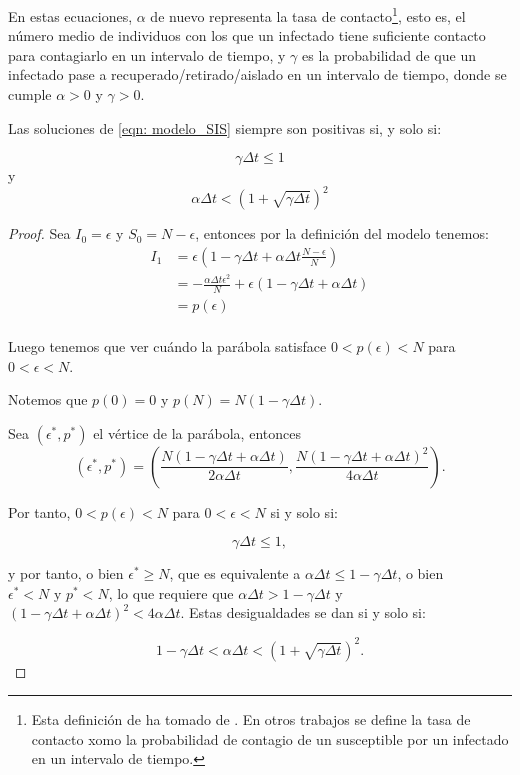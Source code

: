 En estas ecuaciones, $\alpha$ de nuevo representa la tasa de contacto\footnote{Esta definición de ha tomado de \cite{allenDiscretetimeSISIR1994}. En otros trabajos se define la tasa de contacto xomo la probabilidad de contagio de un susceptible por un infectado en un intervalo de tiempo.}, esto es, el número medio de individuos con los que un infectado tiene suficiente contacto para contagiarlo en un intervalo de tiempo, y $\gamma$ es la probabilidad de que un infectado pase a recuperado/retirado/aislado en un intervalo de tiempo, donde se cumple $\alpha >0$ y $\gamma >0$.

\begin{proposition}
Las soluciones de \eqref{eqn: modelo_SIS} siempre son positivas si, y solo si:

$$\gamma \Delta t \leq 1 $$ y $$\alpha\Delta t< \left( 1+\sqrt{\gamma \Delta t} \right)^2$$

\end{proposition}
\begin{proof}
Sea $I_0=\epsilon$ y $S_0=N-\epsilon$, entonces por la definición del modelo tenemos:
\begin{equation}
\begin{aligned}
I_1 & =\epsilon\left(1-\gamma\Delta t+\alpha\Delta t\frac{N-\epsilon}{N}\right) \\
& = -\frac{\alpha\Delta t \epsilon^2}{N} + \epsilon(1-\gamma\Delta t+\alpha\Delta t ) \\
& = p(\epsilon) \\
\end{aligned}
\end{equation}

Luego tenemos que ver cuándo la parábola satisface $0<p(\epsilon)<N$ para $0<\epsilon<N$.

Notemos que $p(0)=0$ y $p(N)=N(1-\gamma\Delta t).$

Sea $(\epsilon^*, p^*)$ el vértice de la parábola, entonces 
$$(\epsilon^*, p^*) = \left(\frac{N(1-\gamma\Delta t+\alpha\Delta t)}{2\alpha\Delta t}, \frac{N(1-\gamma\Delta t+\alpha\Delta t)^2}{4\alpha\Delta t}\right).$$

Por tanto, $0<p(\epsilon )<N$ para $0<\epsilon <N$ si y solo si:

$$\gamma\Delta t \leq 1,$$

y por tanto, o bien $\epsilon^* \geq N$, que es equivalente a $\alpha\Delta t \leq 1-\gamma\Delta t$, o bien $\epsilon^*<N \text{  y  } p^*<N$, lo que requiere que $\alpha\Delta t > 1-\gamma\Delta t$ y $(1-\gamma\Delta t+\alpha\Delta t)^2<4\alpha\Delta t$. Estas desigualdades se dan si y solo si:

$$1-\gamma\Delta t < \alpha \Delta t < \left( 1+\sqrt{\gamma \Delta t} \right)^2.$$

\end{proof}

